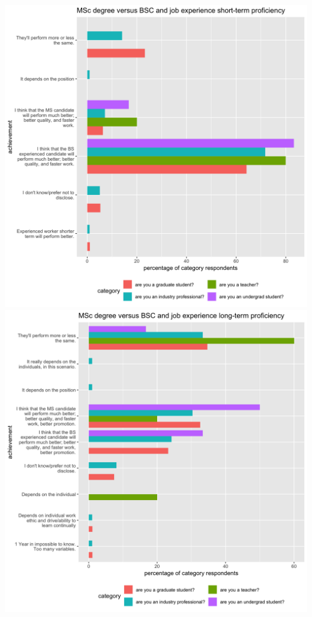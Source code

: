 \documentclass{sigchi}
\begin{document}
\includegraphics[scale=0.2]{../data-analysis/plots_output/MSc_degree_versus_BSC_and_job_experience_short-term_proficiency.png}
\includegraphics[scale=0.2]{../data-analysis/plots_output/MSc_degree_versus_BSC_and_job_experience_long-term_proficiency.png}
\end{document}
